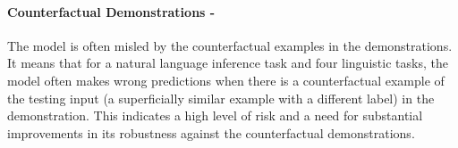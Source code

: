 \paragraph{Counterfactual Demonstrations - \high}
The model is often misled by the counterfactual examples in the demonstrations. It means that for a natural language inference task and four linguistic tasks, the model often makes wrong predictions when there is a counterfactual example of the testing input (a superficially similar example with a different label) in the demonstration. This indicates a high level of risk and a need for substantial improvements in its robustness against the counterfactual demonstrations.